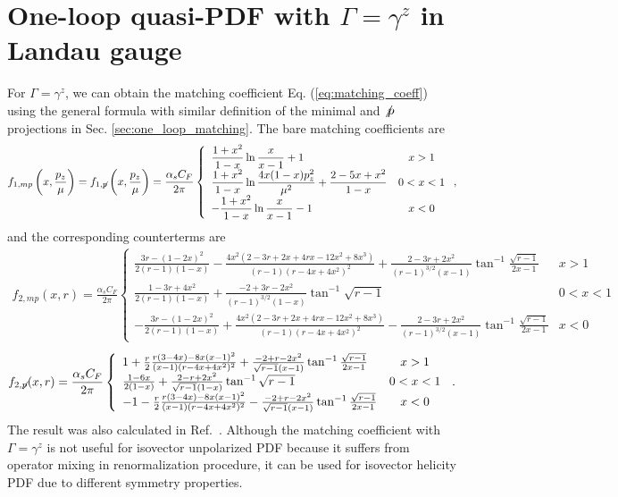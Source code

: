 \section{One-loop quasi-PDF with $\Gamma=\gamma^z$ in Landau gauge}\label{app:one-loop_gamma_z}
For $\Gamma=\gamma^z$, we can obtain the matching coefficient Eq. (\ref{eq:matching_coeff}) using the general formula with similar definition of the minimal and $\slashed p$ projections in Sec. \ref{sec:one_loop_matching}. The bare matching coefficients are
\begin{align}
f_{1,mp}\left(x,\frac{p_z}{\mu}\right)=f_{1,\slashed p}\left(x,\frac{p_z}{\mu}\right)=\frac{\alpha_s C_F}{2\pi}\left\{
\begin{array}{lc}
\displaystyle \frac{1+x^2}{1-x}\ln\frac{x}{x-1}+1 & x>1\\
\displaystyle \frac{1+x^2}{1-x}\ln\frac{4x(1-x)p_z^2}{\mu^2}+\frac{2-5x+x^2}{1-x} & 0<x<1\\
\displaystyle -\frac{1+x^2}{1-x}\ln\frac{x}{x-1}-1 & x<0
\end{array} \right. ,
\end{align}
and the corresponding counterterms are
\begin{align}
f_{2,mp}(x,r)=\frac{\alpha_s C_F}{2\pi}\left\{
\begin{array}{lc}
\frac{3r-(1-2x)^2}{2(r-1)(1-x)}-\frac{4x^2(2-3r+2x+4rx-12x^2+8x^3)}{(r-1)(r-4x+4x^2)^2}+\frac{2-3r+2x^2}{(r-1)^{3/2}(x-1)}\tan^{-1}\frac{\sqrt{r-1}}{2x-1} & x>1\\
\frac{1-3r+4x^2}{2(r-1)(1-x)}+\frac{-2+3r-2x^2}{(r-1)^{3/2}(1-x)}\tan^{-1}\sqrt{r-1} & 0<x<1\\
-\frac{3r-(1-2x)^2}{2(r-1)(1-x)}+\frac{4x^2(2-3r+2x+4rx-12x^2+8x^3)}{(r-1)(r-4x+4x^2)^2}-\frac{2-3r+2x^2}{(r-1)^{3/2}(x-1)}\tan^{-1}\frac{\sqrt{r-1}}{2x-1} & x<0
\end{array} \right.
\end{align}
\begin{align}
f_{2,\slashed{p}}(x,r)=\frac{\alpha_s C_F}{2\pi}\left\{
\begin{array}{lc}
1+\frac{r}{2}\frac{r(3-4x)-8x(x-1)^2}{(x-1)(r-4x+4x^2)^2}+\frac{-2+r-2x^2}{\sqrt{r-1}(x-1)}\tan^{-1}\frac{\sqrt{r-1}}{2x-1} & x>1\\
\frac{1-6x}{2(1-x)}+\frac{2-r+2x^2}{\sqrt{r-1}(1-x)}\tan^{-1}\sqrt{r-1} & 0<x<1\\
-1-\frac{r}{2}\frac{r(3-4x)-8x(x-1)^2}{(x-1)(r-4x+4x^2)^2}-\frac{-2+r-2x^2}{\sqrt{r-1}(x-1)}\tan^{-1}\frac{\sqrt{r-1}}{2x-1} & x<0
\end{array} \right.\,.
\end{align}
The result was also calculated in Ref.~\cite{Stewart:2017tvs}. Although the matching coefficient with $\Gamma=\gamma^z$ is not useful for isovector unpolarized PDF because it suffers from operator mixing in renormalization procedure, it can be used for isovector helicity PDF due to different symmetry properties.



